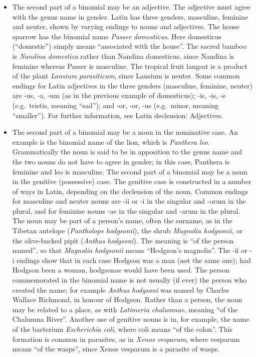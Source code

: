 \begin{itemize}
\tightlist
\item
  The second part of a binomial may be an adjective. The adjective must agree with the genus name in gender. Latin has three genders, masculine, feminine and neuter, shown by varying endings to nouns and adjectives. The house sparrow has the binomial name \emph{Passer domesticus}. Here domesticus (``domestic'') simply means ``associated with the house''. The sacred bamboo is \emph{Nandina domestica} rather than Nandina domesticus, since Nandina is feminine whereas Passer is masculine. The tropical fruit langsat is a product of the plant \emph{Lansium parasiticum}, since Lansium is neuter. Some common endings for Latin adjectives in the three genders (masculine, feminine, neuter) are -us, -a, -um (as in the previous example of domesticus); -is, -is, -e (e.g.~tristis, meaning ``sad''); and -or, -or, -us (e.g.~minor, meaning ``smaller''). For further information, see Latin declension: Adjectives.
\item
  The second part of a binomial may be a noun in the nominative case. An example is the binomial name of the lion, which is \emph{Panthera leo}. Grammatically the noun is said to be in apposition to the genus name and the two nouns do not have to agree in gender; in this case, Panthera is feminine and leo is masculine.
  The second part of a binomial may be a noun in the genitive (possessive) case. The genitive case is constructed in a number of ways in Latin, depending on the declension of the noun. Common endings for masculine and neuter nouns are -ii or -i in the singular and -orum in the plural, and for feminine nouns -ae in the singular and -arum in the plural. The noun may be part of a person's name, often the surname, as in the Tibetan antelope (\emph{Pantholops hodgsonii}), the shrub \emph{Magnolia hodgsonii}, or the olive-backed pipit (\emph{Anthus hodgsoni}). The meaning is ``of the person named'', so that \emph{Magnolia hodgsonii} means ``Hodgson's magnolia''. The -ii or -i endings show that in each case Hodgson was a man (not the same one); had Hodgson been a woman, hodgsonae would have been used. The person commemorated in the binomial name is not usually (if ever) the person who created the name; for example \emph{Anthus hodgsoni} was named by Charles Wallace Richmond, in honour of Hodgson. Rather than a person, the noun may be related to a place, as with \emph{Latimeria chalumnae}, meaning ``of the Chalumna River''. Another use of genitive nouns is in, for example, the name of the bacterium \emph{Escherichia coli}, where coli means ``of the colon''. This formation is common in parasites, as in \emph{Xenos vesparum}, where vesparum means ``of the wasps'', since Xenos vesparum is a parasite of wasps.
\end{itemize}

